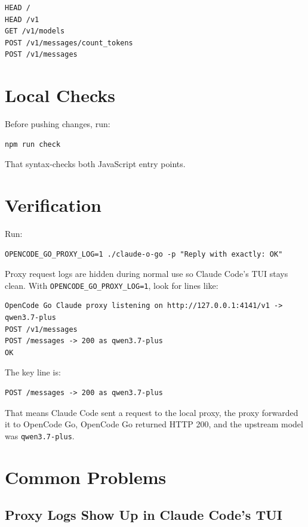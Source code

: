 \documentclass[11pt,a4paper]{article}
\newcommand{\code}[1]{\texttt{#1}}
\begin{document}
\begin{verbatim}
HEAD /
HEAD /v1
GET /v1/models
POST /v1/messages/count_tokens
POST /v1/messages
\end{verbatim}

\section{Local Checks}

Before pushing changes, run:

\begin{verbatim}
npm run check
\end{verbatim}

That syntax-checks both JavaScript entry points.

\section{Verification}

Run:

\begin{verbatim}
OPENCODE_GO_PROXY_LOG=1 ./claude-o-go -p "Reply with exactly: OK"
\end{verbatim}

Proxy request logs are hidden during normal use so Claude Code's TUI stays
clean. With \code{OPENCODE\_GO\_PROXY\_LOG=1}, look for lines like:

\begin{verbatim}
OpenCode Go Claude proxy listening on http://127.0.0.1:4141/v1 -> qwen3.7-plus
POST /v1/messages
POST /messages -> 200 as qwen3.7-plus
OK
\end{verbatim}

The key line is:

\begin{verbatim}
POST /messages -> 200 as qwen3.7-plus
\end{verbatim}

That means Claude Code sent a request to the local proxy, the proxy forwarded it
to OpenCode Go, OpenCode Go returned HTTP 200, and the upstream model was
\code{qwen3.7-plus}.

\section{Common Problems}

\subsection{Proxy Logs Show Up in Claude Code's TUI}
\end{document}
